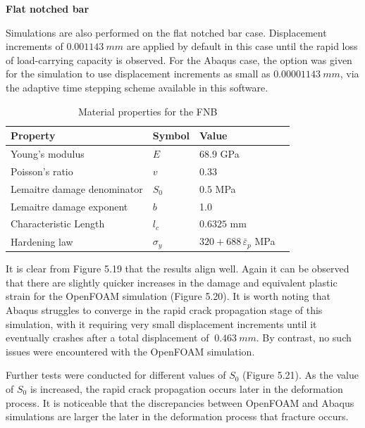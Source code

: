 \documentclass[sn-mathphys,Numbered,draft]{sn-jnl}%
\begin{document}
\textbf{Flat notched bar}

Simulations are also performed on the flat notched bar case. Displacement increments of $0.001143\ mm$ are applied by default in this case until the rapid loss of load-carrying capacity is observed. For the Abaqus case, the option was given for the simulation to use displacement increments as small as $0.00001143\ mm$, via the adaptive time stepping scheme available in this software.

\begin{table}[htb]
	\centering
		\begin{tabular}{llll} \hline
			Property & Symbol & Value  \\ \hline 
			Young's modulus & $E$ & $68.9$ GPa \\
			Poisson's ratio & $v$ & $0.33$   \\
			Lemaitre damage denominator & $S_0$ & $0.5$ MPa  \\
			Lemaitre damage exponent & $b$ & 1.0  \\
			Characteristic Length & $l_c$ & $0.6325$ mm  \\
			Hardening law & $\sigma_y$ & $320+688 \, \bar{\varepsilon}_p$ MPa \\
			\hline
		\end{tabular}
	\caption{Material properties for the FNB}
	\label{tab:material_properties}
\end{table}

It is clear from Figure 5.19 that the results align well. Again it can be observed that there are slightly quicker increases in the damage and equivalent plastic strain for the OpenFOAM simulation (Figure 5.20). It is worth noting that Abaqus struggles to converge in the rapid crack propagation stage of this simulation, with it requiring very small displacement increments until it eventually crashes after a total displacement of $~0.463\ mm$. By contrast, no such issues were encountered with the OpenFOAM simulation.

Further tests were conducted for different values of $S_0$ (Figure 5.21). As the value of $S_0$ is increased, the rapid crack propagation occurs later in the deformation process. It is noticeable that the discrepancies between OpenFOAM and Abaqus simulations are larger the later in the deformation process that fracture occurs.
\end{document}
